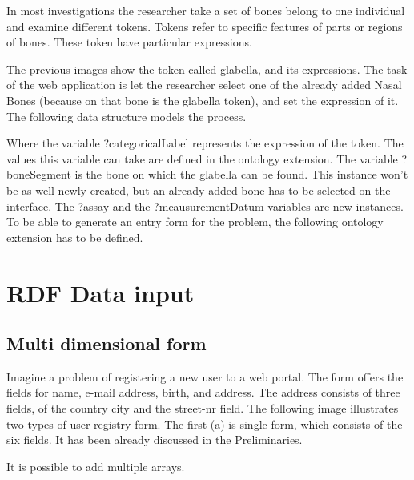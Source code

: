 In most investigations the researcher take a set of bones belong to one individual and examine different tokens. Tokens refer to specific features of parts or regions of bones. These token have particular expressions.


The previous images show the token called glabella, and its expressions. The task of the web application is let the researcher select one of the already added Nasal Bones (because on that bone is the glabella token), and set the expression of it. The following data structure models the process.


Where the variable ?categoricalLabel represents the expression of the token. The values this variable can take are defined in the ontology extension. The variable ?boneSegment is the bone on which the glabella can be found. This instance won’t be as well newly created, but an already added bone has to be selected on the interface. The ?assay and the ?meausurementDatum variables are new instances.  To be able to generate an entry form for the problem, the following ontology extension has to be defined.



\section{RDF Data input}

\subsection{Multi dimensional form}

Imagine a problem of registering a new user to a web portal. The form offers the fields for name, e-mail address, birth, and address. The address consists of three fields, of the country city and the street-nr field. The following image illustrates two types of user registry form. The first (a) is single form, which consists of the six fields. It has been already discussed in the Preliminaries.


It is possible to add multiple arrays.


